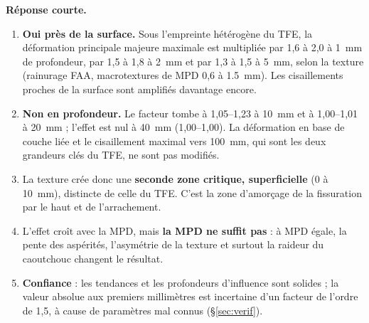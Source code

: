 \begin{encadre}
\textbf{Réponse courte.}
\begin{enumerate}[nosep]
\item \textbf{Oui près de la surface.} Sous l'empreinte hétérogène du TFE, la déformation
      principale majeure maximale est multipliée par 1,6 à 2,0 à \SI{1}{mm}
      de profondeur, par 1,5 à 1,8 à \SI{2}{mm} et par 1,3 à 1,5 à \SI{5}{mm},
      selon la texture (rainurage FAA, macrotextures de MPD 0,6 à \SI{1.5}{mm}). Les
      cisaillements proches de la surface sont amplifiés davantage encore.
\item \textbf{Non en profondeur.} Le facteur tombe à 1,05--1,23 à \SI{10}{mm} et à
      1,00--1,01 à \SI{20}{mm} ; l'effet est nul à \SI{40}{mm} (1,00--1,00). La déformation en base de couche liée et le cisaillement
      maximal vers \SI{100}{mm}, qui sont les deux grandeurs clés du TFE, ne sont pas modifiés.
\item La texture crée donc une \textbf{seconde zone critique, superficielle} (0 à
      \SI{10}{mm}), distincte de celle du TFE. C'est la zone d'amorçage de la fissuration par le
      haut et de l'arrachement.
\item L'effet croît avec la MPD, mais \textbf{la MPD ne suffit pas} : à MPD égale, la pente des
      aspérités, l'asymétrie de la texture et surtout la raideur du caoutchouc changent le
      résultat.
\item \textbf{Confiance} : les tendances et les profondeurs d'influence sont solides ; la valeur
      absolue aux premiers millimètres est incertaine d'un facteur de l'ordre de 1,5, à cause de
      paramètres mal connus (\S\ref{sec:verif}).
\end{enumerate}
\end{encadre}